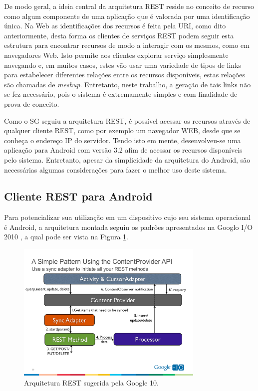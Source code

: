 \documentclass[12pt,a4paper,oneside]{report}
\begin{document}
De modo geral, a ideia central da arquitetura REST reside no conceito de recurso como algum componente de uma aplicação que é valorada por uma identificação única. Na Web as identificações dos recursos é feita pela URI, como dito anteriormente, desta forma os clientes de serviços REST podem seguir esta estrutura para encontrar recursos de modo a interagir com os mesmos, como em navegadores Web. Isto permite aos clientes explorar serviço simplesmente navegando e, em muitos casos, estes vão usar uma variedade de tipos de links para estabelecer diferentes relações entre os recursos disponíveis, estas relações são chamadas de \emph{meshup}. Entretanto, neste trabalho, a geração de tais links não se fez necessário, pois o sistema é extremamente simples e com finalidade de prova de conceito.

Como o SG seguiu a arquitetura REST, é possível acessar os recursos através de qualquer cliente REST, como por exemplo um navegador WEB, desde que se conheça o endereço IP do servidor. Tendo isto em mente, desenvolveu-se uma aplicação para Android com versão 3.2 afim de acessar os recursos disponíveis pelo sistema. Entretanto, apesar da simplicidade da arquitetura do Android, são necessárias algumas considerações para fazer o melhor uso deste sistema.

\subsection{Cliente REST para Android}

Para potencializar sua utilização em um dispositivo cujo seu sistema operacional é Android, a arquitetura montada seguiu os padrões apresentados na Googlo I/O 2010 \cite{restclient}, a qual pode ser vista na Figura \ref{fig:rest_android}.

\begin{figure}[h!]
   \centering
    \includegraphics[width=0.8\textwidth]{figuras/rest_android}
    \caption{Arquitetura REST sugerida pela Google 10.}
    \label{fig:rest_android}
\end{figure}
\end{document}
